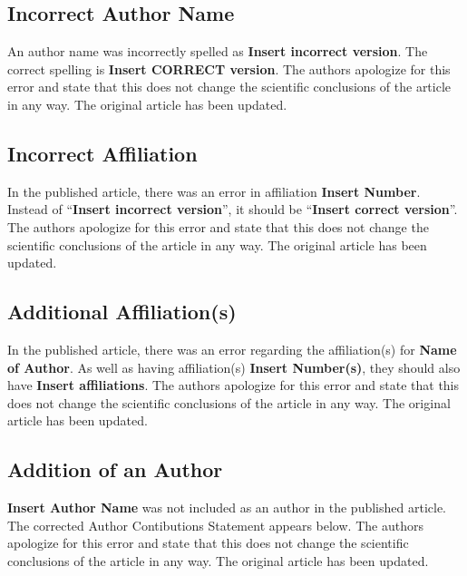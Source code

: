 \documentclass[utf8]{frontiers_correction}
\begin{document}

\subsection*{Incorrect Author Name}
An author name was incorrectly spelled as \textbf{Insert incorrect version}. The correct spelling is \textbf{Insert CORRECT version}. The authors apologize for this error and state that this does not change the scientific conclusions of the article in any way. The original article has been updated.

\subsection*{Incorrect Affiliation}
In the published article, there was an error in affiliation \textbf{Insert Number}. Instead of “\textbf{Insert incorrect version}”, it should be “\textbf{Insert correct version}”. The authors apologize for this error and state that this does not change the scientific conclusions of the article in any way. The original article has been updated.

\subsection*{Additional Affiliation(s)}
In the published article, there was an error regarding the affiliation(s) for \textbf{Name of Author}. As well as having affiliation(s) \textbf{Insert Number(s)}, they should also have \textbf{Insert affiliations}. The authors apologize for this error and state that this does not change the scientific conclusions of the article in any way. The original article has been updated.

\subsection*{Addition of an Author}
\textbf{Insert Author Name} was not included as an author in the published article. The corrected Author Contibutions Statement appears below. The authors apologize for this error and state that this does not change the scientific conclusions of the article in any way. The original article has been updated.
\end{document}

